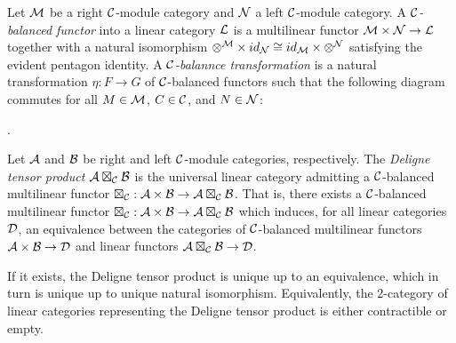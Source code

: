 \documentclass{amsart}
\begin{document}
\begin{definition}
	Let $\mathcal M$ be a right $\mathcal C$-module category and $\mathcal N$ a left $\mathcal C$-module category. A {\em $\mathcal C$-balanced functor} into a linear category $\mathcal L$ is a multilinear functor $\mathcal M \times \mathcal N \to \mathcal L$ together with a natural isomorphism $\otimes^{\mathcal M} \times id_{\mathcal N} \cong id_{\mathcal M} \times \otimes^{\mathcal N}$ satisfying the evident pentagon identity. A {\em $\mathcal C$-balannce transformation} is a natural transformation $\eta:F \to G$ of $\mathcal C$-balanced functors such that the following diagram commutes for all $M \in \mathcal M$, $C \in \mathcal C$, and $N \in \mathcal N$:
\begin{center}
.
\end{center}
\end{definition}


\begin{definition}
	Let $\mathcal A$ and $\mathcal B$ be right and left $\mathcal C$-module categories, respectively. The {\em Deligne tensor product $\mathcal A \boxtimes_{\mathcal C} \mathcal B$} is the universal linear category admitting a $\mathcal C$-balanced multilinear functor $\boxtimes_{\mathcal C}: \mathcal A \times \mathcal B \to \mathcal A \boxtimes_{\mathcal C} \mathcal B$. That is, there exists a $\mathcal C$-balanced multilinear functor $\boxtimes_{\mathcal C}: \mathcal A \times \mathcal B \to \mathcal A \boxtimes_{\mathcal C} \mathcal B$ which induces, for all linear categories $\mathcal D$, an equivalence between the categories of $\mathcal C$-balanced multilinear functors $\mathcal A \times \mathcal B \to \mathcal D$ and linear functors $\mathcal A \boxtimes_{\mathcal C} \mathcal B \to \mathcal D$. 
\end{definition}

If it exists, the Deligne tensor product is unique up to an equivalence, which in turn is unique up to unique natural isomorphism. Equivalently, the 2-category of linear categories representing the Deligne tensor product is either contractible or empty. 
\end{document}
